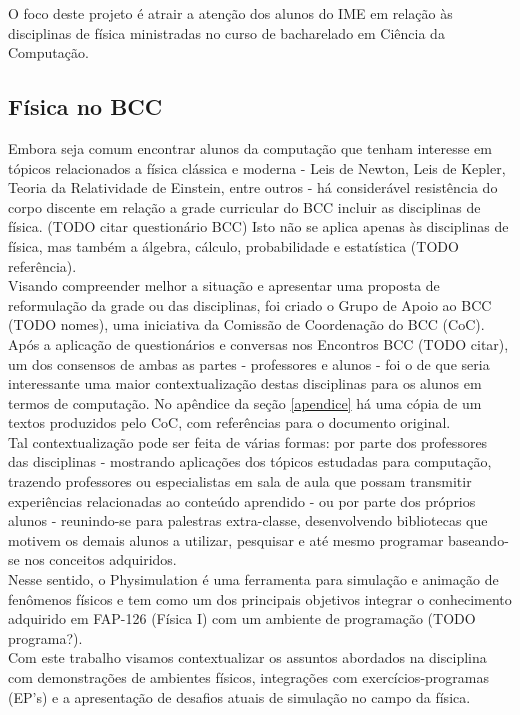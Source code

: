 
O foco deste projeto é atrair a atenção dos alunos do IME em relação às disciplinas de física ministradas no curso de bacharelado em Ciência da Computação.

\subsection{Física no BCC}
Embora seja comum encontrar alunos da computação que tenham interesse em tópicos relacionados a física clássica e moderna - Leis de Newton, Leis de Kepler, Teoria da Relatividade de Einstein, entre outros - há considerável resistência do corpo discente em relação a grade curricular do BCC incluir as disciplinas de física. (TODO citar questionário BCC) Isto não se aplica apenas às disciplinas de física, mas também a álgebra, cálculo, probabilidade e estatística (TODO referência). \\

Visando compreender melhor a situação e apresentar uma proposta de reformulação da grade ou das disciplinas, foi criado o Grupo de Apoio ao BCC (TODO nomes), uma iniciativa da Comissão de Coordenação do BCC (CoC). Após a aplicação de questionários e conversas nos Encontros BCC (TODO citar), um dos consensos de ambas as partes - professores e alunos - foi o de que seria interessante uma maior contextualização destas disciplinas para os alunos em termos de computação. No apêndice da seção \ref{apendice} há uma cópia de um textos produzidos pelo CoC, com referências para o documento original. \\

Tal contextualização pode ser feita de várias formas: por parte dos professores das disciplinas - mostrando aplicações dos tópicos estudadas para computação, trazendo professores ou especialistas em sala de aula que possam transmitir experiências relacionadas ao conteúdo aprendido - ou por parte dos próprios alunos - reunindo-se para palestras extra-classe, desenvolvendo bibliotecas que motivem os demais alunos a utilizar, pesquisar e até mesmo programar baseando-se nos conceitos adquiridos. \\

Nesse sentido, o Physimulation é uma ferramenta para simulação e animação de fenômenos físicos e tem como um dos principais objetivos integrar o conhecimento adquirido em FAP-126 (Física I) com um ambiente de programação (TODO programa?). \\

Com este trabalho visamos contextualizar os assuntos abordados na disciplina com demonstrações de ambientes físicos, integrações com exercícios-programas (EP's) e a apresentação de desafios atuais de simulação no campo da física. 

